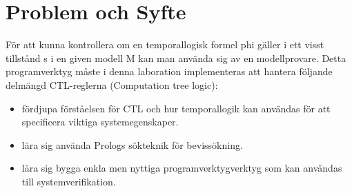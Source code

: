 \section{Problem och Syfte}
För att kunna kontrollera om en temporallogisk formel phi gäller i ett visst tillstånd s i en given modell M kan man använda sig av en modellprovare. Detta programverktyg måste i denna laboration implementeras att hantera följande delmängd CTL-reglerna (Computation tree logic):

\begin{itemize}

\item fördjupa förståelsen för CTL och hur temporallogik kan användas för att speciﬁcera viktiga systemegenskaper.

\item lära sig använda Prologs sökteknik för bevissökning.

\item lära sig bygga enkla men nyttiga programverktygverktyg som kan användas till systemveriﬁkation.

\end{itemize}